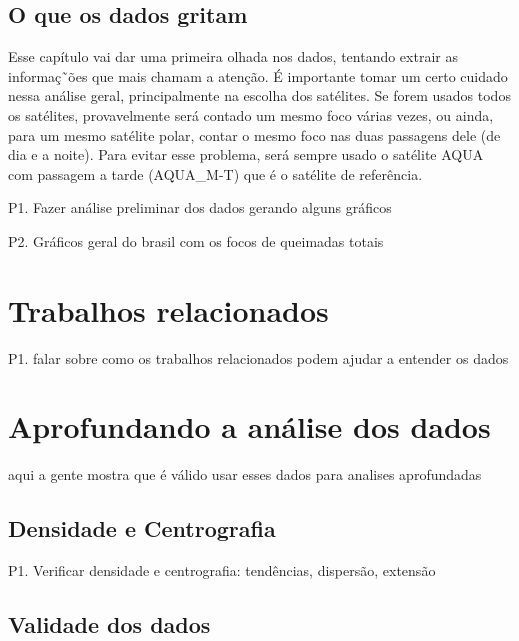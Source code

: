 \documentclass[cic,tc]{iiufrgs}
\begin{document}
\section{O que os dados gritam}

Esse capítulo vai dar uma primeira olhada nos dados, tentando extrair as 
informaç˜ões que mais chamam a atenção. É importante tomar um certo cuidado nessa 
análise geral, principalmente na escolha dos satélites. Se forem usados todos os 
satélites, provavelmente será contado um mesmo foco várias vezes, ou ainda, para um 
mesmo satélite polar, contar o mesmo foco nas duas passagens dele (de dia e a 
noite). Para evitar esse problema, será sempre usado o satélite AQUA com passagem a 
tarde (AQUA\_M-T) que é o satélite de referência. \par


P1. Fazer análise preliminar dos dados gerando alguns gráficos \par
P2. Gráficos geral do brasil com os focos de queimadas totais \cite{geographicDataSciencePython} \par


\chapter{Trabalhos relacionados}

P1. falar sobre como os trabalhos relacionados podem ajudar a entender 
os dados \par




\chapter{Aprofundando a análise dos dados}

aqui a gente mostra que é válido usar esses dados para analises aprofundadas

\section{Densidade e Centrografia}

P1. Verificar densidade e centrografia: tendências, dispersão, extensão \par

\section{Validade dos dados}
\end{document}
